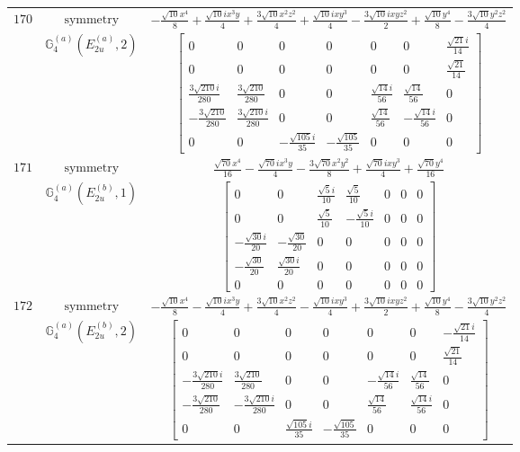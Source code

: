 \documentclass[fleqn,8pt,landscape]{jsarticle}
\begin{document}
\begin{longtable}{ccc}
$ 170 $ & $ \text{symmetry} $ & $ - \frac{\sqrt{10} x^{4}}{8} + \frac{\sqrt{10} i x^{3} y}{4} + \frac{3 \sqrt{10} x^{2} z^{2}}{4} + \frac{\sqrt{10} i x y^{3}}{4} - \frac{3 \sqrt{10} i x y z^{2}}{2} + \frac{\sqrt{10} y^{4}}{8} - \frac{3 \sqrt{10} y^{2} z^{2}}{4} $ \\
$  $ & $ \mathbb{G}_{4}^{(a)}(E_{2u}^{(a)},2) $ & $ \begin{bmatrix} 0 & 0 & 0 & 0 & 0 & 0 & \frac{\sqrt{21} i}{14} \\ 0 & 0 & 0 & 0 & 0 & 0 & \frac{\sqrt{21}}{14} \\ \frac{3 \sqrt{210} i}{280} & \frac{3 \sqrt{210}}{280} & 0 & 0 & \frac{\sqrt{14} i}{56} & \frac{\sqrt{14}}{56} & 0 \\ - \frac{3 \sqrt{210}}{280} & \frac{3 \sqrt{210} i}{280} & 0 & 0 & \frac{\sqrt{14}}{56} & - \frac{\sqrt{14} i}{56} & 0 \\ 0 & 0 & - \frac{\sqrt{105} i}{35} & - \frac{\sqrt{105}}{35} & 0 & 0 & 0 \end{bmatrix} $ \\ \hline
$ 171 $ & $ \text{symmetry} $ & $ \frac{\sqrt{70} x^{4}}{16} - \frac{\sqrt{70} i x^{3} y}{4} - \frac{3 \sqrt{70} x^{2} y^{2}}{8} + \frac{\sqrt{70} i x y^{3}}{4} + \frac{\sqrt{70} y^{4}}{16} $ \\
$  $ & $ \mathbb{G}_{4}^{(a)}(E_{2u}^{(b)},1) $ & $ \begin{bmatrix} 0 & 0 & \frac{\sqrt{5} i}{10} & \frac{\sqrt{5}}{10} & 0 & 0 & 0 \\ 0 & 0 & \frac{\sqrt{5}}{10} & - \frac{\sqrt{5} i}{10} & 0 & 0 & 0 \\ - \frac{\sqrt{30} i}{20} & - \frac{\sqrt{30}}{20} & 0 & 0 & 0 & 0 & 0 \\ - \frac{\sqrt{30}}{20} & \frac{\sqrt{30} i}{20} & 0 & 0 & 0 & 0 & 0 \\ 0 & 0 & 0 & 0 & 0 & 0 & 0 \end{bmatrix} $ \\ \hline
$ 172 $ & $ \text{symmetry} $ & $ - \frac{\sqrt{10} x^{4}}{8} - \frac{\sqrt{10} i x^{3} y}{4} + \frac{3 \sqrt{10} x^{2} z^{2}}{4} - \frac{\sqrt{10} i x y^{3}}{4} + \frac{3 \sqrt{10} i x y z^{2}}{2} + \frac{\sqrt{10} y^{4}}{8} - \frac{3 \sqrt{10} y^{2} z^{2}}{4} $ \\
$  $ & $ \mathbb{G}_{4}^{(a)}(E_{2u}^{(b)},2) $ & $ \begin{bmatrix} 0 & 0 & 0 & 0 & 0 & 0 & - \frac{\sqrt{21} i}{14} \\ 0 & 0 & 0 & 0 & 0 & 0 & \frac{\sqrt{21}}{14} \\ - \frac{3 \sqrt{210} i}{280} & \frac{3 \sqrt{210}}{280} & 0 & 0 & - \frac{\sqrt{14} i}{56} & \frac{\sqrt{14}}{56} & 0 \\ - \frac{3 \sqrt{210}}{280} & - \frac{3 \sqrt{210} i}{280} & 0 & 0 & \frac{\sqrt{14}}{56} & \frac{\sqrt{14} i}{56} & 0 \\ 0 & 0 & \frac{\sqrt{105} i}{35} & - \frac{\sqrt{105}}{35} & 0 & 0 & 0 \end{bmatrix} $ \\ \hline

\end{longtable}
\end{document}
